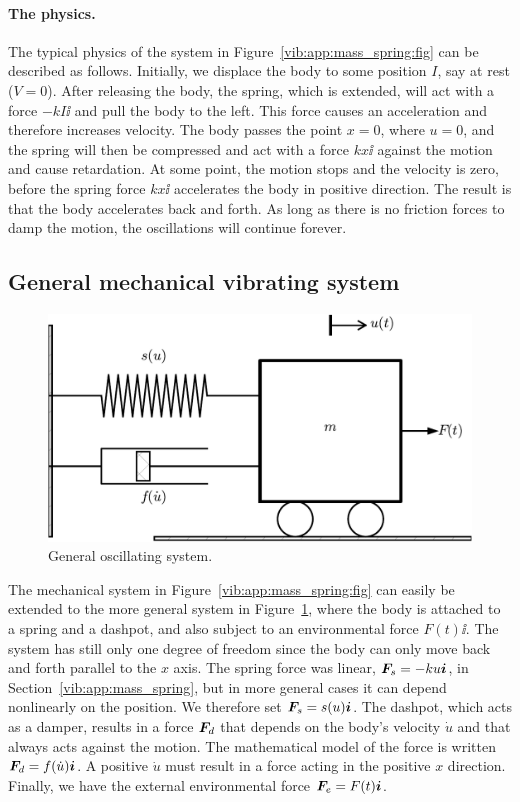 \documentclass[%
oneside,                 %
final,                   %
10pt]{article}
\begin{document}
\paragraph{The physics.}
The typical physics of the system in Figure~\ref{vib:app:mass_spring:fig} can
be described as follows.
Initially, we displace the body to some position $I$, say at rest
($V=0$). After releasing the body, the spring, which is extended, will
act with a force $-kI\ii$ and pull the body to the left. This force
causes an acceleration and therefore increases velocity. The body passes
the point $x=0$, where $u=0$,
and the spring will then be compressed and act with a
force $kx\ii$ against the motion and cause retardation. At some point,
the motion stops and the velocity is zero, before the spring force
$kx\ii$ accelerates the body in positive direction. The result is that
the body accelerates back and forth. As long as there is no friction
forces to damp the motion, the oscillations will continue forever.

\subsection{General mechanical vibrating system}
\label{vib:app:mass_gen}


\begin{figure}[!ht]  %
  \centerline{\includegraphics[width=0.7\linewidth]{fig-vib/oscillator_general.pdf}}
  \caption{
  General oscillating system. \label{vib:app:mass_gen:fig}
  }
\end{figure}


The mechanical system in Figure~\ref{vib:app:mass_spring:fig} can easily be
extended to the more general system in Figure~\ref{vib:app:mass_gen:fig},
where the body is attached to a spring and a dashpot, and also subject
to an environmental force $F(t)\ii$. The system has still only one
degree of freedom since the body can only move back and forth parallel to
the $x$ axis. The spring force was linear, $\F_s=-ku\ii$,
in Section~\ref{vib:app:mass_spring}, but in more general cases it can
depend nonlinearly on the position. We therefore set $\F_s=s(u)\ii$.
The dashpot, which acts
as a damper, results in a force $\F_d$ that depends on the body's
velocity $\dot u$ and that always acts against the motion.
The mathematical model of the force is written $\F_d =f(\dot u)\ii$.
A positive $\dot u$ must result in a force acting in the positive $x$
direction.
Finally, we have the external environmental force $\F_e = F(t)\ii$.
\end{document}
